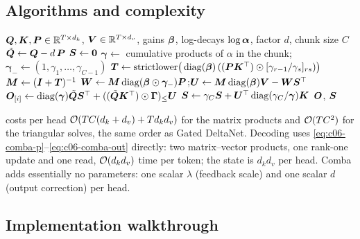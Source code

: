 \subsection{Algorithms and complexity}

\begin{algorithm}[t]
\caption{Comba (SPLR, one head): chunkwise forward pass}
\label{alg:c06-comba}
\begin{algorithmic}[1]
\Require $\bm{Q},\bm{K},\bm{P}\in\mathbb{R}^{T\times d_k}$, $\bm{V}\in\mathbb{R}^{T\times d_v}$, gains $\bm{\beta}$, log-decays $\log\bm{\alpha}$, factor $d$, chunk size $C$
\State $\tilde{\bm{Q}}\gets\bm{Q}-d\,\bm{P}$ 
\State $\bm{S}\gets\bm 0$
  \State $\bm{\gamma}\gets$ cumulative products of $\alpha$ in the chunk; $\bm{\gamma}_-\gets(1,\gamma_1,\dots,\gamma_{C-1})$
  \State $\bm{T}\gets\mathrm{strictlower}\big(\operatorname{diag}(\bm{\beta})\,((\bm{P}\bm{K}^{\top})\odot[\gamma_{r-1}/\gamma_s]_{rs})\big)$
  \State $\bm{M}\gets(\bm{I}+\bm{T})^{-1}$ 
  \State $\bm{W}\gets\bm{M}\operatorname{diag}(\bm{\beta}\odot\bm{\gamma}_-)\bm{P}$;\quad $\bm{U}\gets\bm{M}\operatorname{diag}(\bm{\beta})\bm{V}-\bm{W}\bm{S}^{\top}$
  \State $\bm{O}_{[i]}\gets\operatorname{diag}(\bm{\gamma})\tilde{\bm{Q}}\bm{S}^{\top}+((\tilde{\bm{Q}}\bm{K}^{\top})\odot\bm{\Gamma})_{\le}\bm{U}$
  \State $\bm{S}\gets\gamma_C\bm{S}+\bm{U}^{\top}\operatorname{diag}(\gamma_C/\bm{\gamma})\bm{K}$
\EndFor
\State \Return $\bm{O}$, $\bm{S}$
\end{algorithmic}
\end{algorithm}

 costs per head $\mathcal{O}(TC(d_k+d_v)+Td_kd_v)$ for the matrix products
and $\mathcal{O}(TC^2)$ for the triangular solves, the same order as Gated DeltaNet. Decoding uses
\eqref{eq:c06-comba-p}--\eqref{eq:c06-comba-out} directly: two matrix--vector products, one
rank-one update and one read, $\mathcal{O}(d_kd_v)$ time per token; the state is $d_kd_v$ per
head. Comba adds essentially no parameters: one scalar $\lambda$ (feedback scale) and one
scalar $d$ (output correction) per head.

\subsection{Implementation walkthrough}\label{sec:c06-comba-code}

